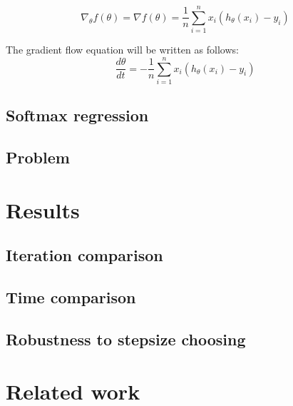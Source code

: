 \documentclass{article} %
\begin{document}
\begin{equation}\label{strang:LogReg_grad}
\nabla_\theta f(\theta) = \nabla f(\theta) = \dfrac{1}{n}\sum\limits_{i=1}^n x_i(h_\theta(x_i) - y_i)
\end{equation}

The gradient flow equation will be written as follows:
\begin{equation}\label{strang:LogReg_GF}
\dfrac{d \theta}{d t} = - \dfrac{1}{n}\sum\limits_{i=1}^n x_i(h_\theta(x_i) - y_i)
\end{equation}


\subsection{Softmax regression}
\subsection{Problem}


\section{Results}
\subsection{Iteration comparison}
\subsection{Time comparison}
\subsection{Robustness to stepsize choosing}



\section{Related work}



\end{document}
